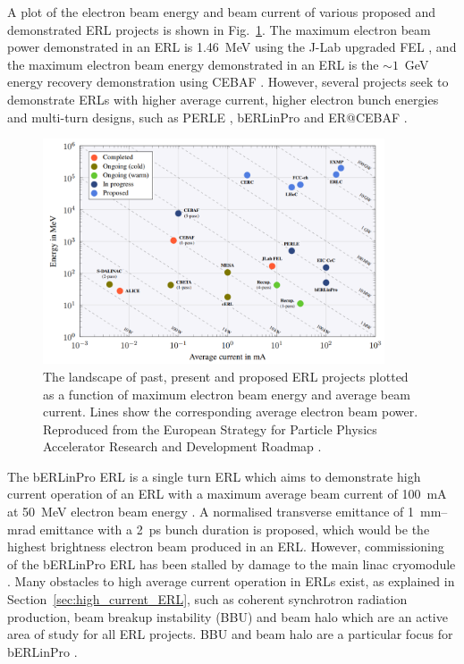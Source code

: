 \documentclass[../main.tex]{subfiles}
\begin{document}
A plot of the electron beam energy and beam current of various proposed and demonstrated ERL projects is shown in Fig.~\ref{fig:ERL_Landscape}. The maximum electron beam power demonstrated in an ERL is 1.46~\si{\mega\electronvolt} using the J-Lab upgraded FEL \cite{neil2006jlab}, and the maximum electron beam energy demonstrated in an ERL is the $\sim1$~\si{\giga\electronvolt} energy recovery demonstration using CEBAF \cite{bogacz2003cebaf,tennant2003beam}. However, several projects seek to demonstrate ERLs with higher average current, higher electron bunch energies and multi-turn designs, such as PERLE \cite{angal2018perle}, bERLinPro \cite{kuske2012conceptual} and ER@CEBAF \cite{meot2016er}.
\begin{figure}[!h]
\centering
\includegraphics[width=0.9\textwidth]{Figures/CBETA_Multi-Pass_Commissioning/Tennant_ERL_Landscape.pdf}
\caption{The landscape of past, present and proposed ERL projects plotted as a function of maximum electron beam energy and average beam current. Lines show the corresponding average electron beam power. Reproduced from the European Strategy for Particle Physics
Accelerator Research and Development Roadmap \cite{adolphsen2022european}.}
\label{fig:ERL_Landscape}
\end{figure}

The bERLinPro ERL is a single turn ERL which aims to demonstrate high current operation of an ERL with a maximum average beam current of 100~\si{\milli\ampere} at 50~\si{\mega\electronvolt} electron beam energy \cite{kuske2012conceptual,neumann2018berlinpro}. A normalised transverse emittance of 1~\si{\milli\meter}--\si{\milli\radian} emittance with a 2~\si{\pico\second} bunch duration is proposed, which would be the highest brightness electron beam produced in an ERL. However, commissioning of the bERLinPro ERL has been stalled by damage to the main linac cryomodule \cite{neumann2018berlinpro}. Many obstacles to high average current operation in ERLs exist, as explained in Section~\ref{sec:high_current_ERL}, such as coherent synchrotron radiation production, beam breakup instability (BBU) and beam halo which are an active area of study for all ERL projects. BBU and beam halo are a particular focus for bERLinPro \cite{neumann2012status,hwang2019first}.
\end{document}
